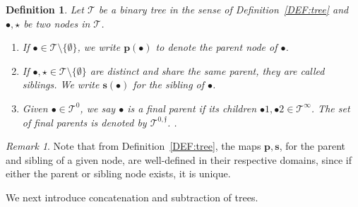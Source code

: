 \documentclass[a4paper,
11pt,  reqno]{amsart}
\newcommand{\5}{\textup{V}}
\newtheorem{definition}[theorem]{Definition}
\theoremstyle{remark}
\newtheorem{remark}[theorem]{Remark}
\newcommand{\bul}{\bullet}
\newcommand{\TT}{\mathcal{T}}
\newcommand{\pb}{\mathbf{p}}
\newcommand{\sbf}{\mathbf{s}}
\newcommand{\ff}{\mathfrak{f}}
\numberwithin{equation}{section}
\numberwithin{theorem}{section}
\begin{document}
\begin{definition}\rm
\label{DEF:tree2}
Let $\TT$ be a binary tree in the sense of Definition~\ref{DEF:tree} and
$\bul, \star$ be two nodes in $\TT$.

\begin{enumerate}



\smallskip
\item[(i)]
If $\bul \in \TT\setminus \{ \emptyset\}$, we write $\pb(\bul)$ to denote the \emph{parent node} of $\bul$.

\smallskip
\item[(ii)]
If $\bul, \star\in \TT \setminus\{ \emptyset \}$ are distinct and share the same parent, they are called \textit{siblings}. We write $\sbf(\bul)$ for the sibling of $\bul$.

\smallskip
\item[(iii)]
Given $\bul\in \TT^0$, we say $\bul$ is a \textit{final parent} if its children $\bul1, \bul2 \in \TT^\infty$. The set of final parents is denoted by $\TT^{0,\ff}$.
.

\end{enumerate}



\end{definition}


\begin{remark}\rm
Note that from Definition~\ref{DEF:tree}, the maps $\pb, \sbf$, for the parent and sibling of a given node, are well-defined in their respective domains, since if either the parent or sibling node exists, it is unique.

\end{remark}





We next introduce concatenation and subtraction of trees.
\end{document}
